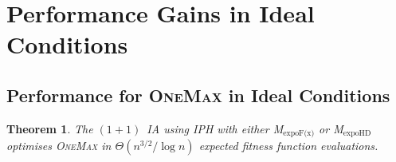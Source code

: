 \documentclass[lettersize,journal]{IEEEtran}
\newcommand{\oneoneIA}{$(1+1)$~IA}
\newcommand{\expoF}{M$_{\text{expoF(x)}}$}
\newcommand{\expoHD}{M$_{\text{expoHD}}$}
\newtheorem{theorem}{Theorem}
\begin{document}



 
 
 

 	
\section{Performance Gains in Ideal Conditions}\label{sec:OptKnown} 








\subsection{Performance for \textsc{OneMax} in Ideal Conditions}




\setcounter{theorem}{1}
\begin{theorem}
The {\oneoneIA } using IPH with either {\expoF } or {\expoHD } optimises \textsc{OneMax} in $\Theta(n^{3/2}/\log n)$ expected fitness function evaluations.
\end{theorem}
\end{document}
